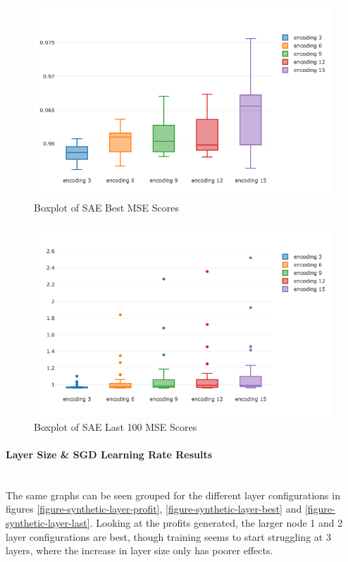 \documentclass[a4paper,latin]{paper}
\begin{document}
\begin{figure}[H]
	\centering \includegraphics[scale=0.5]{images/synthetic_results/boxplot_sae_best_mse.png}
	\caption{Boxplot of SAE Best MSE Scores}
	\label{figure-synthetic-sae-best}
\end{figure}

\begin{figure}[H]
	\centering \includegraphics[scale=0.5]{images/synthetic_results/boxplot_sae_last_mse.png}
	\caption{Boxplot of SAE Last 100 MSE Scores}
	\label{figure-synthetic-sae-last}
\end{figure}

\paragraph{Layer Size \& SGD Learning Rate Results}\mbox{}\\

The same graphs can be seen grouped for the different layer configurations in figures \ref{figure-synthetic-layer-profit}, \ref{figure-synthetic-layer-best} and \ref{figure-synthetic-layer-last}. Looking at the profits generated, the larger node 1 and 2 layer configurations are best, though training seems to start struggling at 3 layers, where the increase in layer size only has poorer effects.\newline
\end{document}
